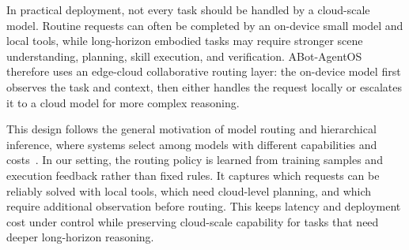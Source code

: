 In practical deployment, not every task should be handled by a cloud-scale model. Routine requests can often be completed by an on-device small model and local tools, while long-horizon embodied tasks may require stronger scene understanding, planning, skill execution, and verification. ABot-AgentOS therefore uses an edge-cloud collaborative routing layer: the on-device model first observes the task and context, then either handles the request locally or escalates it to a cloud model for more complex reasoning.

This design follows the general motivation of model routing and hierarchical inference, where systems select among models with different capabilities and costs~\cite{chen2023frugalgpt,ong2024routellm,anthropic2026advisortool}. In our setting, the routing policy is learned from training samples and execution feedback rather than fixed rules. It captures which requests can be reliably solved with local tools, which need cloud-level planning, and which require additional observation before routing. This keeps latency and deployment cost under control while preserving cloud-scale capability for tasks that need deeper long-horizon reasoning.



